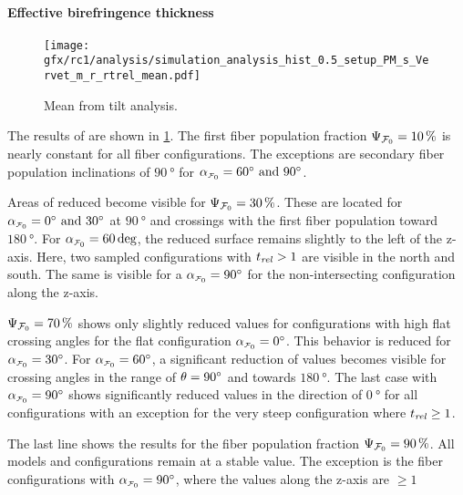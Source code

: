 \paragraph{Effective birefringence thickness \trel{}}
%
\begin{figure}[!p]
    \centering
    \texttt{[image: gfx/rc1/analysis/simulation\_analysis\_hist\_0.5\_setup\_PM\_s\_Vervet\_m\_r\_rtrel\_mean.pdf]}
    \caption{Mean \trel{} from tilt analysis. }
    \label{fig:sim_ana_trel}
\end{figure}
% 
The results of \trel{} are shown in \cref{fig:sim_ana_trel}.
The first fiber population fraction $\textnormal{$\Psi_{\textnormal{$\mathcal{F}_0$}}$}=\SI{10}{\percent}$ 
is nearly constant for all fiber configurations.
The exceptions are secondary fiber population inclinations of $\SI{90}{\degree}$ for $\modelInc=\SIlist{60;90}{\degree}$.
\par
% 
Areas of reduced \trel{} become visible for $\textnormal{$\Psi_{\textnormal{$\mathcal{F}_0$}}$}=\SI{30}{\percent}$.
These are located for $\modelInc=\SIlist{0;30}{\degree}$ at $\SI{90}{\degree}$ and crossings with the first fiber population toward $\SI{180}{\degree}$.
For $\modelInc=\SI{60}{\deg}$, the reduced \trel{} surface remains slightly to the left of the z-axis.
Here, two sampled configurations with $\textnormal{$t_\mathit{rel}$} > 1$ are visible in the north and south.
The same is visible for a $\modelInc=\SI{90}{\degree}$ for the non-intersecting configuration along the z-axis.
\par
% 
$\textnormal{$\Psi_{\textnormal{$\mathcal{F}_0$}}$}=\SI{70}{\percent}$ shows only slightly reduced \trel{} values for configurations with high flat crossing angles for the flat configuration $\modelInc=\SI{0}{\degree}$.
This behavior is reduced for $\modelInc=\SI{30}{\degree}$.
For $\modelInc=\SI{60}{\degree}$, a significant reduction of \trel{} values becomes visible for crossing angles in the range of $\textnormal{$\theta$}=\SI{90}{\degree}$ and towards $\SI{180}{\degree}$.
The last case with $\modelInc=\SI{90}{\degree}$ shows significantly reduced \trel{} values in the direction of $\SI{0}{\degree}$ for all configurations with an exception for the very steep configuration where $\textnormal{$t_\mathit{rel}$} \geq \SI{1}{}$.
\par
% 
The last line shows the results for the fiber population fraction $\textnormal{$\Psi_{\textnormal{$\mathcal{F}_0$}}$}=\SI{90}{\percent}$.
All models and configurations remain at a stable \trel{} value.
The exception is the fiber configurations with $\modelInc=\SI{90}{\degree}$, where the \trel{} values along the z-axis are $\geq \SI{1}{}$
%
